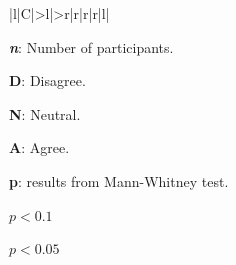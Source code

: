 \begin{table}[H]
\begin{threeparttable}[t]
\begin{tabularx}{\textwidth}{|l|C|>{\scriptsize}l|>{\scriptsize}r|r|r|r|l|}
\end{tabularx}
\begin{tablenotes}
    \scriptsize
     \item[] \textbf{\textit{n}}: Number of participants.
     \item[] \textbf{D}: Disagree.
     \item[] \textbf{N}: Neutral.
     \item[] \textbf{A}: Agree.
     \item[] \textbf{p}: results from Mann-Whitney test.\\
     \item[*] $p < 0.1$ 
     \item[**] $p < 0.05$ 
   \end{tablenotes}
   \end{threeparttable}
\caption[The most noticeable differences in enjoyment for the two sample groups.]{The most noticeable differences in enjoyment for the two sample groups. Full table in Appendix \ref{appendix:statistics}.}
\label{tab:statement_significant_enjoyment}
\end{table}




